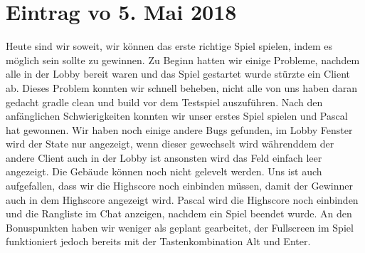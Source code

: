 \documentclass{scrartcl}
\newcommand{\n}{\newline}
\begin{document}
\section*{Eintrag vo 5. Mai 2018}
Heute sind wir soweit, wir können das erste richtige Spiel spielen, indem es möglich sein sollte zu gewinnen.\n
Zu Beginn hatten wir einige Probleme, nachdem alle in der Lobby bereit waren und das Spiel gestartet wurde stürzte ein Client ab. Dieses Problem konnten wir schnell beheben, nicht alle von uns haben daran gedacht gradle clean und build vor dem Testspiel auszuführen. Nach den anfänglichen Schwierigkeiten konnten wir unser erstes Spiel spielen und Pascal hat gewonnen. \n
Wir haben noch einige andere Bugs gefunden, im Lobby Fenster wird der State nur angezeigt, wenn dieser gewechselt wird währenddem der andere Client auch in der Lobby ist ansonsten wird das Feld einfach leer angezeigt. Die Gebäude können noch nicht gelevelt werden. \n
Uns ist auch aufgefallen, dass wir die Highscore noch einbinden müssen, damit der Gewinner auch in dem Highscore angezeigt wird. \n
Pascal wird die Highscore noch einbinden und die Rangliste im Chat anzeigen, nachdem ein Spiel beendet wurde. An den Bonuspunkten haben wir weniger als geplant gearbeitet, der Fullscreen im Spiel funktioniert jedoch bereits mit der Tastenkombination Alt und Enter.
\end{document}
